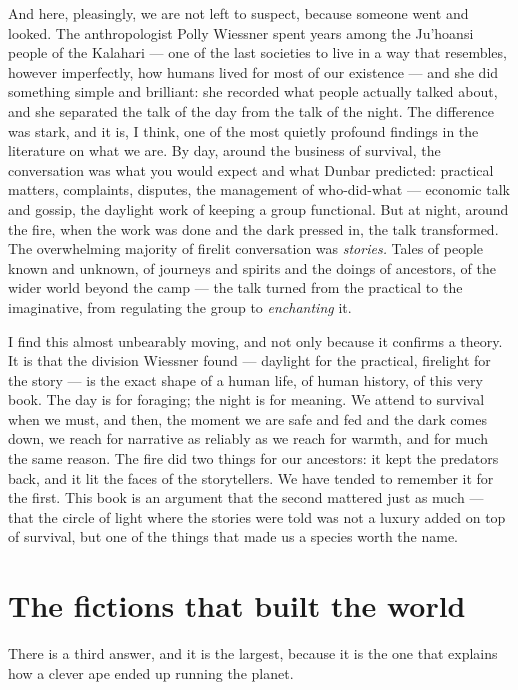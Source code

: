 And here, pleasingly, we are not left to suspect, because someone went and looked. The anthropologist Polly Wiessner spent years among the Ju'hoansi people of the Kalahari — one of the last societies to live in a way that resembles, however imperfectly, how humans lived for most of our existence — and she did something simple and brilliant: she recorded what people actually talked about, and she separated the talk of the day from the talk of the night. The difference was stark, and it is, I think, one of the most quietly profound findings in the literature on what we are. By day, around the business of survival, the conversation was what you would expect and what Dunbar predicted: practical matters, complaints, disputes, the management of who-did-what — economic talk and gossip, the daylight work of keeping a group functional. But at night, around the fire, when the work was done and the dark pressed in, the talk transformed. The overwhelming majority of firelit conversation was \emph{stories.} Tales of people known and unknown, of journeys and spirits and the doings of ancestors, of the wider world beyond the camp — the talk turned from the practical to the imaginative, from regulating the group to \emph{enchanting} it.

I find this almost unbearably moving, and not only because it confirms a theory. It is that the division Wiessner found — daylight for the practical, firelight for the story — is the exact shape of a human life, of human history, of this very book. The day is for foraging; the night is for meaning. We attend to survival when we must, and then, the moment we are safe and fed and the dark comes down, we reach for narrative as reliably as we reach for warmth, and for much the same reason. The fire did two things for our ancestors: it kept the predators back, and it lit the faces of the storytellers. We have tended to remember it for the first. This book is an argument that the second mattered just as much — that the circle of light where the stories were told was not a luxury added on top of survival, but one of the things that made us a species worth the name.

\section*{The fictions that built the world}

There is a third answer, and it is the largest, because it is the one that explains how a clever ape ended up running the planet.

